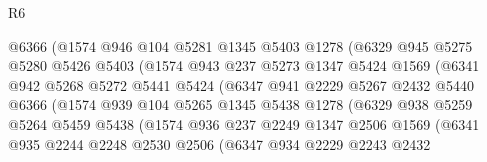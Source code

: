 \begin{lexlean}{R6}
\begin{coremodule}
                        @6366
                        (@1574
                          @946
                          @104
                          @5281
                          @1345
                          @5403
                          @1278
                          (@6329
                            @945
                            @5275
                            @5280
                            @5426
                            @5403
                            (@1574
                              @943
                              @237
                              @5273
                              @1347
                              @5424
                              @1569
                              (@6341
                                @942
                                @5268
                                @5272
                                @5441
                                @5424
                                (@6347
                                  @941
                                  @2229
                                  @5267
                                  @2432
                                  @5440
                                  @6366
                                  (@1574
                                    @939
                                    @104
                                    @5265
                                    @1345
                                    @5438
                                    @1278
                                    (@6329
                                      @938
                                      @5259
                                      @5264
                                      @5459
                                      @5438
                                      (@1574
                                        @936
                                        @237
                                        @2249
                                        @1347
                                        @2506
                                        @1569
                                        (@6341
                                          @935
                                          @2244
                                          @2248
                                          @2530
                                          @2506
                                          (@6347
                                            @934
                                            @2229
                                            @2243
                                            @2432

\end{coremodule}
\end{lexlean}
